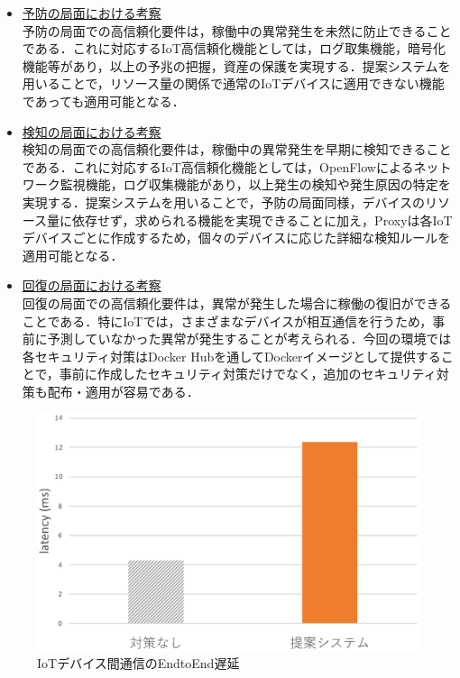 \documentclass[Japanese]{dicomopapers}
\begin{document}
\begin{itemize}
	\item \underline{予防の局面における考察}\mbox{}\\
	      予防の局面での高信頼化要件は，稼働中の異常発生を未然に防止できることである．これに対応するIoT高信頼化機能としては，ログ取集機能，暗号化機能等があり，以上の予兆の把握，資産の保護を実現する．提案システムを用いることで，リソース量の関係で通常のIoTデバイスに適用できない機能であっても適用可能となる．
	\item \underline{検知の局面における考察}\mbox{}\\
	      検知の局面での高信頼化要件は，稼働中の異常発生を早期に検知できることである．これに対応するIoT高信頼化機能としては，OpenFlowによるネットワーク監視機能，ログ収集機能があり，以上発生の検知や発生原因の特定を実現する．提案システムを用いることで，予防の局面同様，デバイスのリソース量に依存せず，求められる機能を実現できることに加え，Proxyは各IoTデバイスごとに作成するため，個々のデバイスに応じた詳細な検知ルールを適用可能となる．
	\item \underline{回復の局面における考察}\mbox{}\\
	      回復の局面での高信頼化要件は，異常が発生した場合に稼働の復旧ができることである．特にIoTでは，さまざまなデバイスが相互通信を行うため，事前に予測していなかった異常が発生することが考えられる．今回の環境では各セキュリティ対策はDocker Hubを通してDockerイメージとして提供することで，事前に作成したセキュリティ対策だけでなく，追加のセキュリティ対策も配布・適用が容易である．
\end{itemize}

\begin{figure}[!tb]
	\centering
	\includegraphics[width=\linewidth]{img/result.eps}
	\caption{IoTデバイス間通信のEndtoEnd遅延}
	\label{fig:result2}
\end{figure}
\end{document}
